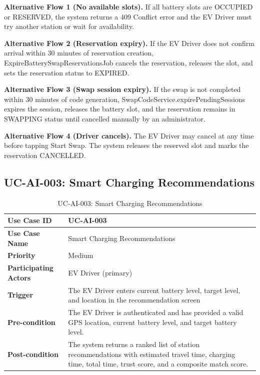 \documentclass[../Main.tex]{subfiles}
\begin{document}
\textbf{Alternative Flow 1 (No available slots).} If all battery slots are OCCUPIED or RESERVED, the system returns a 409 Conflict error and the EV Driver must try another station or wait for availability.

\textbf{Alternative Flow 2 (Reservation expiry).} If the EV Driver does not confirm arrival within 30 minutes of reservation creation, ExpireBatterySwapReservationsJob cancels the reservation, releases the slot, and sets the reservation status to EXPIRED.

\textbf{Alternative Flow 3 (Swap session expiry).} If the swap is not completed within 30 minutes of code generation, SwapCodeService.expirePendingSessions expires the session, releases the battery slot, and the reservation remains in SWAPPING status until cancelled manually by an administrator.

\textbf{Alternative Flow 4 (Driver cancels).} The EV Driver may cancel at any time before tapping Start Swap. The system releases the reserved slot and marks the reservation CANCELLED.

\subsection{UC-AI-003: Smart Charging Recommendations}
\label{subsection:2.3.3}

\begin{table}[H]
\caption{UC-AI-003: Smart Charging Recommendations}
\label{table:uc-ai-003}
\begin{tabular}{|p{3.5cm}|p{12cm}|}
\hline
\textbf{Use Case ID} & UC-AI-003 \\ \hline
\textbf{Use Case Name} & Smart Charging Recommendations \\ \hline
\textbf{Priority} & Medium \\ \hline
\textbf{Participating Actors} & EV Driver (primary) \\ \hline
\textbf{Trigger} & The EV Driver enters current battery level, target level, and location in the recommendation screen \\ \hline
\textbf{Pre-condition} & The EV Driver is authenticated and has provided a valid GPS location, current battery level, and target battery level. \\ \hline
\textbf{Post-condition} & The system returns a ranked list of station recommendations with estimated travel time, charging time, total time, trust score, and a composite match score. \\ \hline
\end{tabular}
\end{table}
\end{document}
